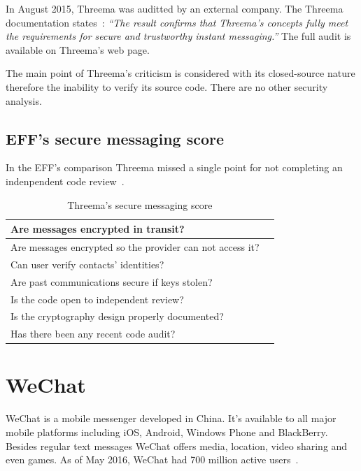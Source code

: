 \documentclass[thesis=M,english]{FITthesis}[2012/10/20]
\newcommand{\cmark}{\ding{51}}%
\newcommand{\xmark}{\ding{55}}%
\begin{document}
In August 2015, Threema was auditted by an external company. The Threema documentation states~\cite{threema-audit}: \emph{``The result confirms that Threema's concepts fully meet the requirements for secure and trustworthy instant messaging.''} The full audit is available on Threema's web page.

The main point of Threema's criticism is considered with its closed-source nature therefore the inability to verify its source code. There are no other security analysis.

\subsection{EFF's secure messaging score}

In the EFF's comparison Threema missed a single point for not completing an indenpendent code review~\cite{eff-score}.

\begin{table}[htb]
	\centering
	\caption{Threema's secure messaging score}
	\label{my-label}
	\begin{tabular}{|l|l|}
		\hline
		Are messages encrypted in transit? & \cmark \\\hline
		Are messages encrypted so the provider can not access it? & \cmark \\ \hline
		Can user verify contacts' identities? & \cmark \\ \hline
		Are past communications secure if keys stolen? & \cmark \\ \hline
		Is the code open to independent review? & \xmark \\ \hline
		Is the cryptography design properly documented? & \cmark \\ \hline
		Has there been any recent code audit? & \cmark \\ \hline
	\end{tabular}
\end{table}


\section{WeChat}

WeChat is a mobile messenger developed in China. It's available to all major mobile platforms including iOS, Android, Windows Phone and BlackBerry. Besides regular text messages WeChat offers media, location, video sharing and even games. As of May 2016, WeChat had 700 million active users~\cite{wechat-users}.
\end{document}
